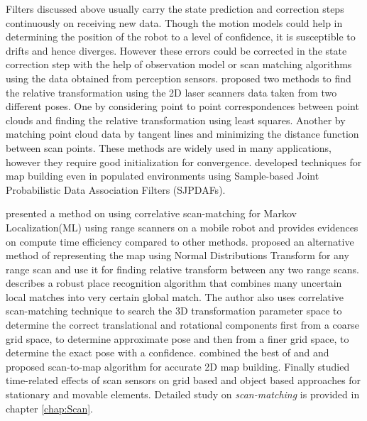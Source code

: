 Filters discussed above usually carry the state prediction and correction steps continuously on receiving new data. Though the motion models could help in determining the position of the robot to a level of confidence, it is susceptible to drifts and hence diverges. However these errors could be corrected in the state correction step with the help of observation model or scan matching algorithms using the data obtained from perception sensors. \cite{lu1997} proposed two methods to find the relative transformation using the 2D laser scanners data taken from two different poses. One by considering point to point correspondences between point clouds and finding the relative transformation using least squares. Another by matching point cloud data by tangent lines and minimizing the distance function between scan points. These methods are widely used in many applications, however they require good initialization for convergence.  \cite{D.Hahnel} developed techniques for map building even in populated environments using Sample-based Joint Probabilistic Data Association Filters (SJPDAFs). 
\par
\cite{Konolige} presented a method on using correlative scan-matching for Markov Localization(ML) using range scanners on a mobile robot and provides evidences on compute time efficiency compared to other methods. \cite{P.Biber} proposed an alternative method of representing the map using Normal Distributions Transform for any range scan and use it for finding relative transform between any two range scans. \cite{E.Olson/LocalSM} describes a robust place recognition algorithm that combines many uncertain local matches into very certain global match. The author also uses correlative scan-matching technique to search the 3D transformation parameter space to determine the correct translational and rotational components first from a coarse grid space, to determine approximate pose and then from a finer grid space, to determine the exact pose with a confidence. \cite{K.Ryu} combined the best of \cite{lu1997} and \cite{P.Biber} and proposed scan-to-map algorithm for accurate 2D map building. Finally \cite{7795620} studied time-related effects of scan sensors on grid based and object based approaches for stationary and movable elements. Detailed study on \textit{scan-matching} is provided in chapter \ref{chap:Scan}.





